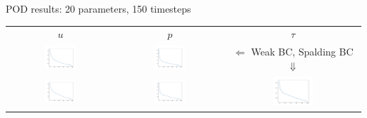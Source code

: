 \documentclass[9pt,compress,t,aspectratio=169]{beamer}
\newcommand{\1}{\begin{pmatrix}
		1\\
		1
\end{pmatrix}}
\newcommand{\highlight}[1]{\textbf{\color{bluemathlab}#1}}
\newcommand{\highlightB}[1]{\textbf{\color{black!15!orangemathlab}#1}}
\begin{document}
\begin{frame}{POD results: 20 parameters, 150 timesteps}
	\begin{tabular}{ccc}
		$u$&$p$&$\tau$\\
		\includegraphics[width=0.31\textwidth]{figures/cylinder_turb_weak_eigs_u.pdf}&
		\includegraphics[width=0.31\textwidth]{figures/cylinder_turb_weak_eigs_p.pdf}&
		$\Leftarrow$ Weak BC, Spalding BC $\Downarrow$
		\\
		\includegraphics[width=0.31\textwidth]{figures/cylinder_turb_spalding_eigs_u.pdf}&
		\includegraphics[width=0.31\textwidth]{figures/cylinder_turb_spalding_eigs_p.pdf}&
		\includegraphics[width=0.31\textwidth]{figures/cylinder_turb_spalding_eigs_tau.pdf}
	\end{tabular}\hfill
\end{frame}
%
%	
\end{document}

